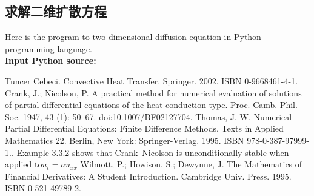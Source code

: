 \documentclass[twoside,twocolumn]{article}
\begin{document}
\begin{CJK*}{UTF8}{gkai}
\begin{appendices}
\section{求解二维扩散方程}
Here is the program to two dimensional diffusion equation in Python programming language.\\
\textbf{\textcolor[rgb]{0.98,0.00,0.00}{Input Python source:}}
	
\end{appendices}


\newpage
\renewcommand\refname{参考文献}
\begin{thebibliography}{99}
	Tuncer Cebeci. Convective Heat Transfer. Springer. 2002. ISBN 0-9668461-4-1.
	Crank, J.; Nicolson, P. A practical method for numerical evaluation of solutions of partial differential equations of the heat conduction type. Proc. Camb. Phil. Soc. 1947, 43 (1): 50–67. doi:10.1007/BF02127704.
	 Thomas, J. W. Numerical Partial Differential Equations: Finite Difference Methods. Texts in Applied Mathematics 22. Berlin, New York: Springer-Verlag. 1995. ISBN 978-0-387-97999-1.. Example 3.3.2 shows that Crank–Nicolson is unconditionally stable when applied to$u_{t}=au_{xx}$
	Wilmott, P.; Howison, S.; Dewynne, J. The Mathematics of Financial Derivatives: A Student Introduction. Cambridge Univ. Press. 1995. ISBN 0-521-49789-2.
\end{thebibliography} 

\end{CJK*}
\end{document}
